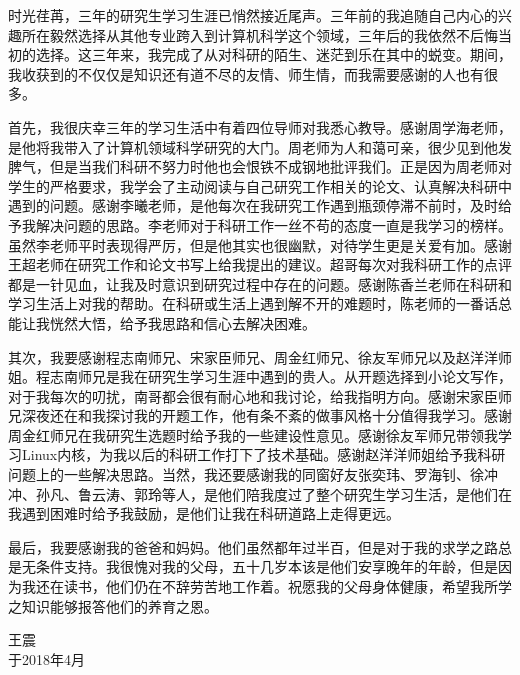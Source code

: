 \begin{acknowledgements}
时光荏苒，三年的研究生学习生涯已悄然接近尾声。三年前的我追随自己内心的兴趣所在毅然选择从其他专业跨入到计算机科学这个领域，三年后的我依然不后悔当初的选择。这三年来，我完成了从对科研的陌生、迷茫到乐在其中的蜕变。期间，我收获到的不仅仅是知识还有道不尽的友情、师生情，而我需要感谢的人也有很多。

首先，我很庆幸三年的学习生活中有着四位导师对我悉心教导。感谢周学海老师，是他将我带入了计算机领域科学研究的大门。周老师为人和蔼可亲，很少见到他发脾气，但是当我们科研不努力时他也会恨铁不成钢地批评我们。正是因为周老师对学生的严格要求，我学会了主动阅读与自己研究工作相关的论文、认真解决科研中遇到的问题。感谢李曦老师，是他每次在我研究工作遇到瓶颈停滞不前时，及时给予我解决问题的思路。李老师对于科研工作一丝不苟的态度一直是我学习的榜样。虽然李老师平时表现得严厉，但是他其实也很幽默，对待学生更是关爱有加。感谢王超老师在研究工作和论文书写上给我提出的建议。超哥每次对我科研工作的点评都是一针见血，让我及时意识到研究过程中存在的问题。感谢陈香兰老师在科研和学习生活上对我的帮助。在科研或生活上遇到解不开的难题时，陈老师的一番话总能让我恍然大悟，给予我思路和信心去解决困难。

其次，我要感谢程志南师兄、宋家臣师兄、周金红师兄、徐友军师兄以及赵洋洋师姐。程志南师兄是我在研究生学习生涯中遇到的贵人。从开题选择到小论文写作，对于我每次的叨扰，南哥都会很有耐心地和我讨论，给我指明方向。感谢宋家臣师兄深夜还在和我探讨我的开题工作，他有条不紊的做事风格十分值得我学习。感谢周金红师兄在我研究生选题时给予我的一些建设性意见。感谢徐友军师兄带领我学习Linux内核，为我以后的科研工作打下了技术基础。感谢赵洋洋师姐给予我科研问题上的一些解决思路。当然，我还要感谢我的同窗好友张奕玮、罗海钊、徐冲冲、孙凡、鲁云涛、郭玲等人，是他们陪我度过了整个研究生学习生活，是他们在我遇到困难时给予我鼓励，是他们让我在科研道路上走得更远。

最后，我要感谢我的爸爸和妈妈。他们虽然都年过半百，但是对于我的求学之路总是无条件支持。我很愧对我的父母，五十几岁本该是他们安享晚年的年龄，但是因为我还在读书，他们仍在不辞劳苦地工作着。祝愿我的父母身体健康，希望我所学之知识能够报答他们的养育之恩。

\begin{flushright}
王震 \\
于2018年4月
\end{flushright}



\end{acknowledgements}
